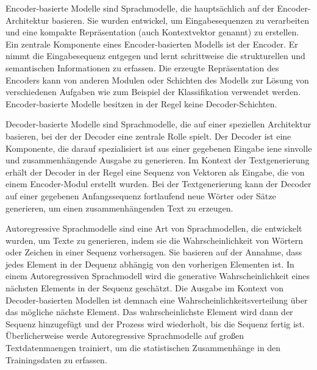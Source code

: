\begin{definition}\label{def:encoder-basierte-modelle}
    Encoder-basierte Modelle sind Sprachmodelle, die hauptsächlich auf der Encoder-Architektur basieren.
    Sie wurden entwickel, um Eingabesequenzen zu verarbeiten und eine kompakte Repräsentation (auch Kontextvektor genannt) zu erstellen.
    Ein zentrale Komponente eines Encoder-basierten Modells ist der Encoder.
    Er nimmt die Eingabesequenz entgegen und lernt schrittweise die strukturellen und semantischen Informationen zu erfassen.
    Die erzeugte Repräsentation des Encoders kann von anderen Modulen oder Schichten des Modells zur Lösung von verschiedenen Aufgaben 
    wie zum Beispiel der Klassifikation verwendet werden.
    Encoder-basierte Modelle besitzen in der Regel keine Decoder-Schichten.
\end{definition}
\begin{definition}\label{def:decoder-basierte-modelle}
    Decoder-basierte Modelle sind Sprachmodelle, die auf einer speziellen Architektur basieren, bei der der Decoder eine zentrale Rolle spielt.
    Der Decoder ist eine Komponente, die darauf spezialisiert ist aus einer gegebenen Eingabe iene sinvolle und zusammenhängende Ausgabe zu generieren.
    Im Kontext der Textgenerierung erhält der Decoder in der Regel eine Sequenz von Vektoren als Eingabe, die von einem Encoder-Modul erstellt wurden.
    Bei der Textgenerierung kann der Decoder auf einer gegebenen Anfangssequenz fortlaufend neue Wörter oder Sätze generieren, um einen zusammenhängenden Text zu erzeugen.
\end{definition}

\begin{definition}\label{def:autoregressive-sprachmodelle}
    Autoregressive Sprachmodelle sind eine Art von Sprachmodellen, die entwickelt wurden, um Texte zu generieren,
    indem sie die Wahrscheinlichkeit von Wörtern oder Zeichen in einer Sequenz vorhersagen.
    Sie basieren auf der Annahme, dass jedes Element in der Dequenz abhängig von den vorherigen Elementen ist.
    In einem Autoregressiven Sprachmodell wird die generative Wahrscheinlichkeit eines nächsten Elements in der Sequenz geschätzt.
    Die Ausgabe im Kontext von Decoder-basierten Modellen ist demnach eine Wahrscheinlichkeitsverteilung über das mögliche nächste Element.
    Das wahrscheinlichste Element wird dann der Sequenz hinzugefügt und der Prozess wird wiederholt, bis die Sequenz fertig ist.
    Überlicherweise werde Autoregressive Sprachmodelle auf großen Textdatenmaengen trainiert, um die statistischen Zusammenhänge in den Trainingsdaten zu erfassen.
\end{definition}


